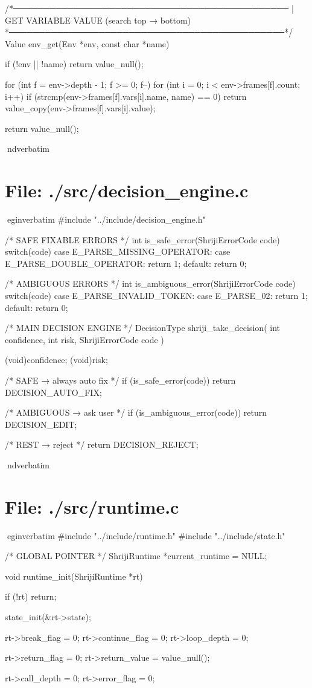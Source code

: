 \documentclass{article}
\begin{document}
/*──────────────────────────────────────────────
 | GET VARIABLE VALUE (search top → bottom)
 *──────────────────────────────────────────────*/
Value env_get(Env *env, const char *name)
{
    if (!env || !name) return value_null();

    for (int f = env->depth - 1; f >= 0; f--) {
        for (int i = 0; i < env->frames[f].count; i++) {
            if (strcmp(env->frames[f].vars[i].name, name) == 0) {
                return value_copy(env->frames[f].vars[i].value);
            }
        }
    }

    return value_null();
}
nd{verbatim}
\section*{File: ./src/decision_engine.c}
egin{verbatim}
#include "../include/decision_engine.h"

/* SAFE FIXABLE ERRORS */
int is_safe_error(ShrijiErrorCode code)
{
    switch(code)
    {
        case E_PARSE_MISSING_OPERATOR:
        case E_PARSE_DOUBLE_OPERATOR:
            return 1;
        default:
            return 0;
    }
}

/* AMBIGUOUS ERRORS */
int is_ambiguous_error(ShrijiErrorCode code)
{
    switch(code)
    {
        case E_PARSE_INVALID_TOKEN:
        case E_PARSE_02:
            return 1;
        default:
            return 0;
    }
}

/* MAIN DECISION ENGINE */
DecisionType shriji_take_decision(
    int confidence,
    int risk,
    ShrijiErrorCode code
)
{
    (void)confidence;
    (void)risk;

    /* SAFE → always auto fix */
    if (is_safe_error(code))
        return DECISION_AUTO_FIX;

    /* AMBIGUOUS → ask user */
    if (is_ambiguous_error(code))
        return DECISION_EDIT;

    /* REST → reject */
    return DECISION_REJECT;
}
nd{verbatim}
\section*{File: ./src/runtime.c}
egin{verbatim}
#include "../include/runtime.h"
#include "../include/state.h"

/* GLOBAL POINTER */
ShrijiRuntime *current_runtime = NULL;

void runtime_init(ShrijiRuntime *rt)
{
    if (!rt) return;

    state_init(&rt->state);

    rt->break_flag = 0;
    rt->continue_flag = 0;
    rt->loop_depth = 0;

    rt->return_flag = 0;
    rt->return_value = value_null();

    rt->call_depth = 0;
    rt->error_flag = 0;
}
\end{document}
